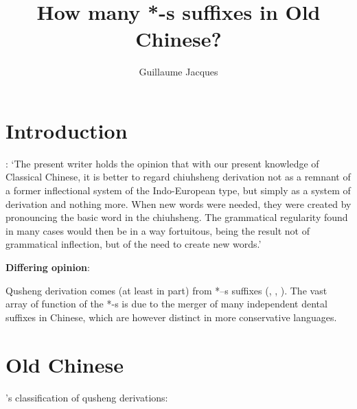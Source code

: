 \documentclass[oldfontcommands,oneside,a4paper,11pt]{article}
\newcommand{\ipa}[1]{{\phon \mbox{#1}}} %
\begin{document}
 
\title{How many *-s suffixes in Old Chinese? }
\author{Guillaume Jacques}
\maketitle
\linenumbers


\section{Introduction}
 \citet[262]{downer59}:
`The present writer holds the opinion that with our present knowledge of Classical Chinese, it is better to regard chiuhsheng derivation not as a remnant of a former inflectional system of the Indo-European type, but simply as a system of derivation and nothing more. When new words were needed, they were created by pronouncing the basic word in the chiuhsheng. The grammatical regularity found in many cases would then be in a way fortuitous, being the result not of grammatical inflection, but of the need to create new words.'

\textbf{Differing opinion}:

Qusheng derivation comes (at least in part) from *\ipa{--s} suffixes (\citealt{haudricourt54chinois}, \citealt{forrest60occlusives}, \citealt{sagart99roc, bs14oc}). The vast array of function of the *-s is due to the merger of many independent dental suffixes in Chinese, which are however distinct in more conservative languages.



\section{Old Chinese}
\citet{downer59}'s classification of qusheng derivations:
\end{document}
